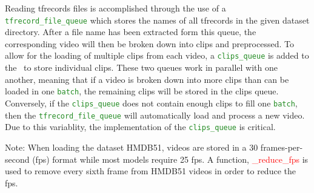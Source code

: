 \documentclass{llncs}
\begin{document}
Reading tfrecords files is accomplished through the use of a \texttt{\textcolor{ForestGreen}{tfrecord\_file\-\_queue}} which stores the names of all tfrecords in the given dataset directory.
After a file name has been extracted form this queue, the corresponding video will then be broken down into clips and preprocessed.
To allow for the loading of multiple clips from each video, a \texttt{\textcolor{ForestGreen}{clips\_queue}} is added to the \data~to store individual clips.
These two queues work in parallel with one another, meaning that if a video is broken down into more clips than can be loaded in one \texttt{\textcolor{ForestGreen}{batch}}, the remaining clips will be stored in the clips queue.
Conversely, if the \texttt{\textcolor{ForestGreen}{clips\_queue}} does not contain enough clips to fill one \texttt{\textcolor{ForestGreen}{batch}}, then the \texttt{\textcolor{ForestGreen}{tfrecord\_file\_queue}} will automatically load and process a new video.
Due to this variablity, the implementation of the \texttt{\textcolor{ForestGreen}{clips\_queue}} is critical.

Note: When loading the dataset HMDB51, videos are stored in a 30 frames-per-second (fps) format while most models require 25 fps. A function, \textcolor{red}{\_reduce\_fps} is used to remove every sixth frame from HMDB51 videos in order to reduce the fps.
\end{document}
